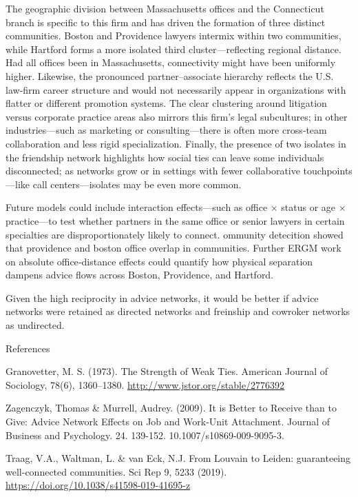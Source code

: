 \documentclass[
]{article}
\begin{document}
The geographic division between Massachusetts offices and the
Connecticut branch is specific to this firm and has driven the formation
of three distinct communities. Boston and Providence lawyers intermix
within two communities, while Hartford forms a more isolated third
cluster---reflecting regional distance. Had all offices been in
Massachusetts, connectivity might have been uniformly higher. Likewise,
the pronounced partner--associate hierarchy reflects the U.S. law‐firm
career structure and would not necessarily appear in organizations with
flatter or different promotion systems. The clear clustering around
litigation versus corporate practice areas also mirrors this firm's
legal subcultures; in other industries---such as marketing or
consulting---there is often more cross‐team collaboration and less rigid
specialization. Finally, the presence of two isolates in the friendship
network highlights how social ties can leave some individuals
disconnected; as networks grow or in settings with fewer collaborative
touchpoints---like call centers---isolates may be even more common.

Future models could include interaction effects---such as office ×
status or age × practice---to test whether partners in the same office
or senior lawyers in certain specialties are disproportionately likely
to connect. ommunity detecition showed that providence and boston office
overlap in communities. Further ERGM work on absolute office‐distance
effects could quantify how physical separation dampens advice flows
across Boston, Providence, and Hartford.

Given the high reciprocity in advice networks, it would be better if
advice networks were retained as directed networks and freinship and
cowroker networks as undirected.

References

Granovetter, M. S. (1973). The Strength of Weak Ties. American Journal
of Sociology, 78(6), 1360--1380.
\url{http://www.jstor.org/stable/2776392}

Zagenczyk, Thomas \& Murrell, Audrey. (2009). It is Better to Receive
than to Give: Advice Network Effects on Job and Work-Unit Attachment.
Journal of Business and Psychology. 24. 139-152.
10.1007/s10869-009-9095-3.

Traag, V.A., Waltman, L. \& van Eck, N.J. From Louvain to Leiden:
guaranteeing well-connected communities. Sci Rep 9, 5233 (2019).
\url{https://doi.org/10.1038/s41598-019-41695-z}
\end{document}

